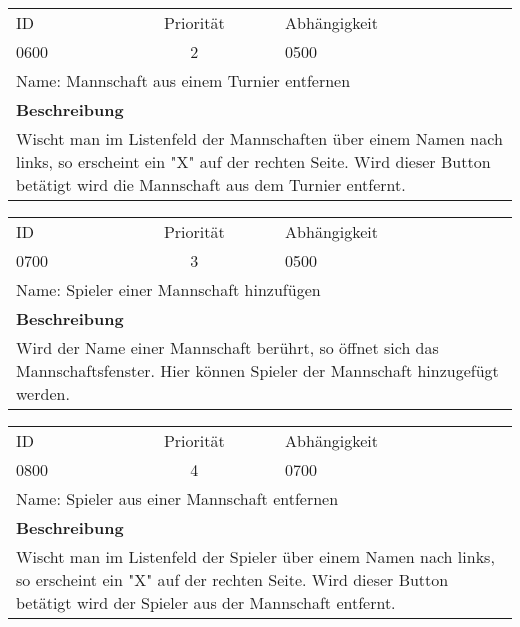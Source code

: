 	\begin{tabularx}{\textwidth}{|l|c|l|}
		\hline
		ID & Priorität & Abhängigkeit \\
		0600 & 2 & 0500\\
		\hline
		\multicolumn{3}{|l|}{Name: Mannschaft aus einem Turnier entfernen} \\
		\hline
		\multicolumn{3}{|l|}{\textbf{Beschreibung}}\\
		\multicolumn{3}{|X|}{Wischt man im Listenfeld der Mannschaften über einem Namen nach links, so erscheint ein "X" auf der rechten Seite. Wird dieser Button betätigt wird die Mannschaft aus dem Turnier entfernt.}\\
		\hline		 
	\end{tabularx}
	
	\begin{tabularx}{\textwidth}{|l|c|l|}
		\hline
		ID & Priorität & Abhängigkeit \\
		0700 & 3 & 0500\\
		\hline
		\multicolumn{3}{|l|}{Name: Spieler einer Mannschaft hinzufügen} \\
		\hline
		\multicolumn{3}{|l|}{\textbf{Beschreibung}}\\
		\multicolumn{3}{|X|}{Wird der Name einer Mannschaft berührt, so öffnet sich das Mannschaftsfenster. Hier können Spieler der Mannschaft hinzugefügt werden.}\\
		\hline		 
	\end{tabularx}
	
	\begin{tabularx}{\textwidth}{|l|c|l|}
		\hline
		ID & Priorität & Abhängigkeit \\
		0800 & 4 & 0700\\
		\hline
		\multicolumn{3}{|l|}{Name: Spieler aus einer Mannschaft entfernen} \\
		\hline
		\multicolumn{3}{|l|}{\textbf{Beschreibung}}\\
		\multicolumn{3}{|X|}{Wischt man im Listenfeld der Spieler über einem Namen nach links, so erscheint ein "X" auf der rechten Seite. Wird dieser Button betätigt wird der Spieler aus der Mannschaft entfernt.}\\
		\hline		 
	\end{tabularx}
	
